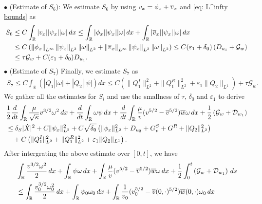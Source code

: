 \documentclass[11pt,reqno]{amsart}
\begin{document}
\begin{appendix}
\noindent $\bullet$ (Estimate of $S_6$): We estimate $S_{6}$ by using $v_x= \phi_x + \overline{v}_x$ and \eqref{eq: L^infty bounds} as
\begin{align*}
S_{6} & \le C \int_{\mathbb{R}} |v_x| |\psi_x|  |\omega| \, dx 
\le \int_{\mathbb{R}} | \phi_x|  |\psi_x| | \omega | \, dx + \int_{\mathbb{R}} |\overline{v}_x| |\psi_x |  |\omega | \, dx \\ 
&\le C\left( \left\lVert\phi_x\right\rVert_{L^\infty} \left\lVert\psi_x\right\rVert_{L^2 } \left\lVert\omega\right\rVert_{L^2}+\left\lVert\overline{v}_x\right\rVert_{L^\infty}  \left\lVert\psi_x\right\rVert_{L^2} \left\lVert\omega\right\rVert_{L^2} \right)\le C (\varepsilon_1+\delta_0 ) \left(  D_{u_1}  + \mathcal{G}_w \right) \\ 
&\le \tau \mathcal{G}_w + C (\varepsilon_1+\delta_0) D_{u_1}.
\end{align*}
\noindent$\bullet$ (Estimate of $S_{7}$)
Finally, we estimate $S_{7}$ as
\begin{align*}
S_{7} \le C \int_\mathbb{R} (|Q_1| |\omega| + |Q_2| |\psi|) dx\le  C \left(\|Q_1^I\|_{L^2}^2 + \|Q_1^R\|_{L^2}^2 + \varepsilon_1 \|Q_2\|_{L^1} \right) + \tau \mathcal{G}_w .
\end{align*}
We gather all the estimates for $S_i$ and use the smallness of $\tau$, $\delta_0$ and $\varepsilon_1$ to derive
\begin{align*}
&\frac{1}{2}\frac{d}{dt} \int_\mathbb{R} \frac{\mu }{\sqrt{\kappa}}v^{3/2} \omega^2 \, dx + \frac{d}{dt} \int_\mathbb{R} \omega \psi \, dx + \frac{d}{dt} \int_\mathbb{R} \frac{\mu}{v} (v^{5/2}-\overline{v}^{5/2}) \overline{w} \omega \, dx + \frac{1}{2} \left( \mathcal{G}_w + \mathcal{D}_{w_1} \right) \\ 
&\le \delta_S | \dot{X}|^2 + C \|\psi_x \|_{L^2}^2 
+ C  \sqrt{\delta_0} \left( \| \phi_x \|_{L^2}^2 +D_{u_2} +G^S_v + G^R + \|Q_2\|_{L^2}^2  \right) \\
&\quad +C \left(\|Q_1^I\|_{L^2}^2 + \|Q_1^R\|_{L^2}^2 + \varepsilon_1 \|Q_2\|_{L^1} \right).
\end{align*}
After intergrating the above estimate over $[0,t]$, we have
\begin{align*}
\begin{aligned} %
&\int_\mathbb{R} \frac{v^{3/2} \omega^2}{2} \, dx +  \int_\mathbb{R} \psi \omega \, dx + \int_\mathbb{R} \frac{\mu}{v} (v^{5/2} -\ov^{5/2}) \ow \omega \, dx + \frac{1}{2} \int_0^t \left(\mathcal{G}_w + \mathcal{D}_{w_1} \right) \, d s \\ 
&\le  \int_\mathbb{R} \frac{v_0^{3/2} \omega_0^2}{2} \, dx +  \int_\mathbb{R} \psi_0 \omega_0 \, dx + \int_\mathbb{R} \frac{1}{v_0} (v_0^{5/2} -\ov(0,\cdot)^{5/2}) \ow(0,\cdot) \omega_0 \, dx \\

\end{aligned}
\end{align*}
\end{appendix}
\end{document}
